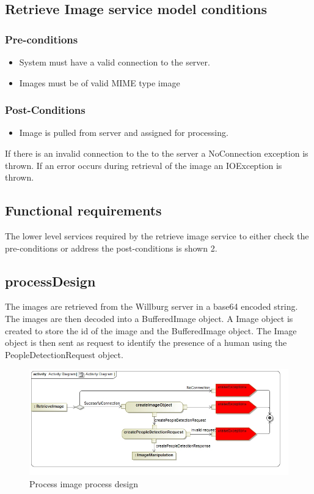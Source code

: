 \documentclass[a4paper,12pt]{report}
\begin{document}
	\subsection {Retrieve Image service model conditions}
		\subsubsection {Pre-conditions}
			\begin {itemize}
				\item System must have a valid connection to the server. 
				\item Images must be of valid MIME type image
			\end {itemize}
		\subsubsection {Post-Conditions}
			\begin {itemize}
				\item Image is pulled from server and assigned for processing. 
			\end {itemize}
If there is an invalid connection to the to the server a NoConnection exception is thrown. If an error occurs during retrieval of the image an IOException is thrown.
			
		
		
		\subsection {Functional requirements}
The lower level services required by the retrieve image service to either check the pre-conditions or address the post-conditions is shown 2.

		\newpage
		\FloatBarrier
		\subsection {processDesign}
		The images are retrieved from the Willburg server in a base64 encoded string. The images are then decoded into a BufferedImage object. A Image object is created to store the id of the image and the BufferedImage object. The Image object is then sent as request to identify the presence of a human using the PeopleDetectionRequest object.
		\FloatBarrier
		\begin{figure}[htb]
			\centering
			\includegraphics [scale=0.5]{../Diagrams/RetrieveImage_ActivityDiagram.jpg}
			\caption{Process image process design}
		\end{figure}	
		\FloatBarrier
\end{document}
